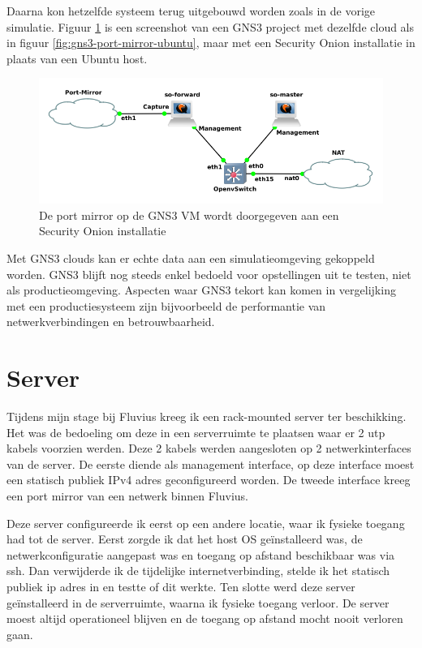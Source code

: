 \documentclass[a4paper,12pt]{report}
\begin{document}
Daarna kon hetzelfde systeem terug uitgebouwd worden zoals in de vorige simulatie.
Figuur \ref{fig:gns3-port-mirror-so} is een screenshot van een GNS3 project met dezelfde cloud als in figuur \ref{fig:gns3-port-mirror-ubuntu}, maar met een Security Onion installatie in plaats van een Ubuntu host.

\begin{figure}[H]
  \centering
  \includegraphics[width=\textwidth]{gns3-port-mirror-so}
  \caption{De port mirror op de GNS3 VM wordt doorgegeven aan een Security Onion installatie}
  \label{fig:gns3-port-mirror-so}
\end{figure}

Met GNS3 clouds kan er echte data aan een simulatieomgeving gekoppeld worden.
GNS3 blijft nog steeds enkel bedoeld voor opstellingen uit te testen, niet als productieomgeving.
Aspecten waar GNS3 tekort kan komen in vergelijking met een productiesysteem zijn bijvoorbeeld de performantie van netwerkverbindingen en betrouwbaarheid.

\section{Server}
\label{sec:server}
Tijdens mijn stage bij Fluvius kreeg ik een rack-mounted server ter beschikking.
Het was de bedoeling om deze in een serverruimte te plaatsen waar er 2 utp kabels voorzien werden.
Deze 2 kabels werden aangesloten op 2 netwerkinterfaces van de server.
De eerste diende als management interface, op deze interface moest een statisch publiek IPv4 adres geconfigureerd worden.
De tweede interface kreeg een port mirror van een netwerk binnen Fluvius.

Deze server configureerde ik eerst op een andere locatie, waar ik fysieke toegang had tot de server.
Eerst zorgde ik dat het host OS geïnstalleerd was, de netwerkconfiguratie aangepast was en toegang op afstand beschikbaar was via ssh.
Dan verwijderde ik de tijdelijke internetverbinding, stelde ik het statisch publiek ip adres in en testte of dit werkte.
Ten slotte werd deze server geïnstalleerd in de serverruimte, waarna ik fysieke toegang verloor.
De server moest altijd operationeel blijven en de toegang op afstand mocht nooit verloren gaan.
\end{document}
